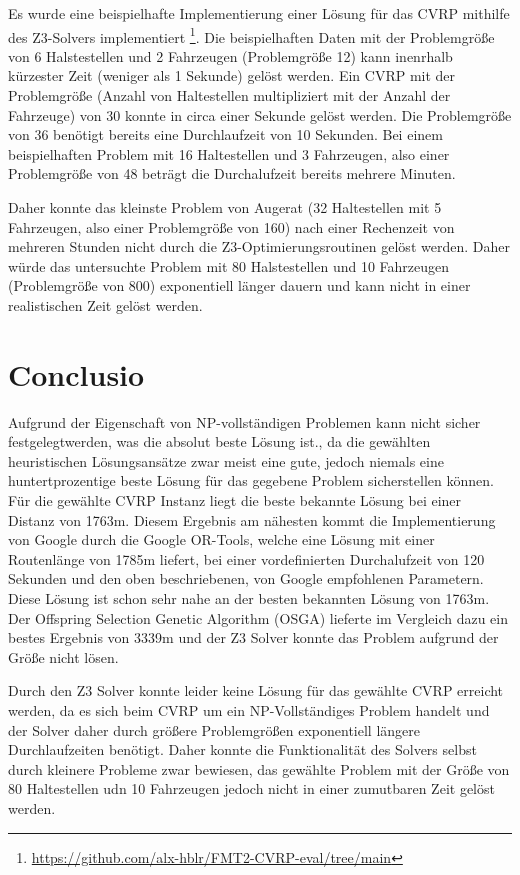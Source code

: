 \documentclass{IEEEtran}
\begin{document}
Es wurde eine beispielhafte Implementierung einer Lösung für das CVRP mithilfe des Z3-Solvers implementiert \footnote{\url{https://github.com/alx-hblr/FMT2-CVRP-eval/tree/main}}. Die beispielhaften Daten mit der Problemgröße von 6 Halstestellen und 2 Fahrzeugen (Problemgröße 12) kann inenrhalb kürzester Zeit (weniger als 1 Sekunde) gelöst werden. Ein CVRP mit der Problemgröße (Anzahl von Haltestellen multipliziert mit der Anzahl der Fahrzeuge) von 30 konnte in circa einer Sekunde gelöst werden. Die Problemgröße von 36 benötigt bereits eine Durchlaufzeit von 10 Sekunden. Bei einem beispielhaften Problem mit 16 Haltestellen und 3 Fahrzeugen, also einer Problemgröße von 48 beträgt die Durchalufzeit bereits mehrere Minuten. 

Daher konnte das kleinste Problem von Augerat (32 Haltestellen mit 5 Fahrzeugen, also einer Problemgröße von 160) nach einer Rechenzeit von mehreren Stunden nicht durch die Z3-Optimierungsroutinen gelöst werden. Daher würde das untersuchte Problem mit 80 Halstestellen und 10 Fahrzeugen (Problemgröße von 800) exponentiell länger dauern und kann nicht in einer realistischen Zeit gelöst werden.


\section{Conclusio}
Aufgrund der Eigenschaft von NP-vollständigen Problemen kann nicht  sicher festgelegtwerden, was die absolut beste Lösung ist., da die gewählten heuristischen Lösungsansätze zwar meist eine gute, jedoch niemals eine huntertprozentige beste Lösung für das gegebene Problem sicherstellen können. 
Für die gewählte CVRP Instanz liegt die beste bekannte Lösung bei einer Distanz von 1763m\cite{Heuristiclab}. Diesem Ergebnis am nähesten kommt die Implementierung von Google durch die Google OR-Tools, welche eine Lösung mit einer Routenlänge von 1785m liefert, bei einer vordefinierten Durchalufzeit von 120 Sekunden und den oben beschriebenen, von Google empfohlenen Parametern. Diese Lösung ist schon sehr nahe an der besten bekannten Lösung von 1763m. Der Offspring Selection Genetic Algorithm (OSGA) lieferte im Vergleich dazu ein bestes Ergebnis von 3339m und der Z3 Solver konnte das Problem aufgrund der Größe nicht lösen. 

Durch den Z3 Solver konnte leider keine Lösung für das gewählte CVRP erreicht werden, da es sich beim CVRP um ein NP-Vollständiges Problem handelt und der Solver daher durch größere Problemgrößen exponentiell längere Durchlaufzeiten benötigt. Daher konnte die Funktionalität des Solvers selbst durch kleinere Probleme zwar bewiesen, das gewählte Problem mit der Größe von 80 Haltestellen udn 10 Fahrzeugen jedoch nicht in einer zumutbaren Zeit gelöst werden. 

\printbibliography
\newpage
\appendix
\end{document}
